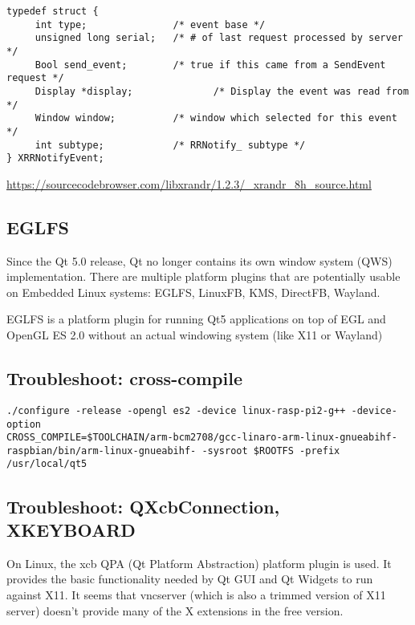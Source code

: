 \begin{verbatim}
typedef struct {
     int type;               /* event base */
     unsigned long serial;   /* # of last request processed by server */
     Bool send_event;        /* true if this came from a SendEvent request */
     Display *display;              /* Display the event was read from */
     Window window;          /* window which selected for this event */
     int subtype;            /* RRNotify_ subtype */
} XRRNotifyEvent;
\end{verbatim}



\url{https://sourcecodebrowser.com/libxrandr/1.2.3/_xrandr_8h_source.html}

\subsection{EGLFS}
\label{sec:EGLFS}

Since the Qt 5.0 release, Qt no longer contains its own window system (QWS)
implementation. There are multiple platform plugins that are potentially usable
on Embedded Linux systems: EGLFS, LinuxFB, KMS, DirectFB, Wayland. 

EGLFS is a platform plugin for running Qt5 applications on top of EGL and OpenGL
ES 2.0 without an actual windowing system (like X11 or Wayland)

\subsection{Troubleshoot: cross-compile}

\begin{verbatim}
./configure -release -opengl es2 -device linux-rasp-pi2-g++ -device-option
CROSS_COMPILE=$TOOLCHAIN/arm-bcm2708/gcc-linaro-arm-linux-gnueabihf-raspbian/bin/arm-linux-gnueabihf- -sysroot $ROOTFS -prefix /usr/local/qt5
\end{verbatim}


\subsection{Troubleshoot: QXcbConnection, XKEYBOARD}

On Linux, the xcb QPA (Qt Platform Abstraction) platform plugin is used. It
provides the basic functionality needed by Qt GUI and Qt Widgets to run against
X11. It seems that vncserver (which is also a trimmed version of X11
server) doesn't provide many of the X extensions in the free version.

